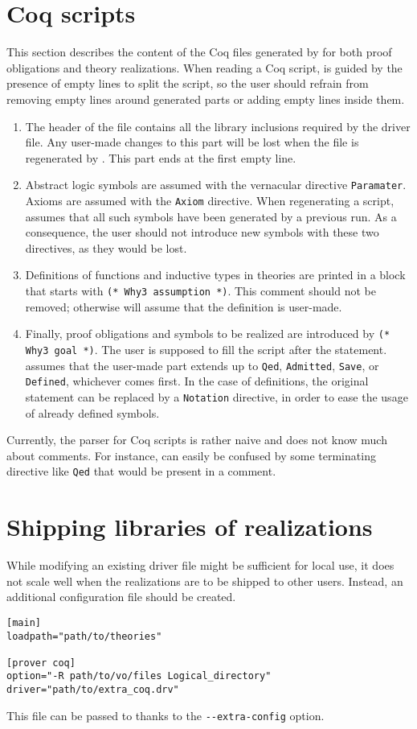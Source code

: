 \section{Coq scripts}

This section describes the content of the Coq files generated by \why for
both proof obligations and theory realizations. When reading a Coq
script, \why is guided by the presence of empty lines to split the
script, so the user should refrain from removing empty lines around
generated parts or adding empty lines inside them.

\begin{enumerate}
\item	The header of the file contains all the library inclusions
	required by the driver file. Any user-made changes to this part
	will be lost when the file is regenerated by \why. This part ends
	at the first empty line.
\item	Abstract logic symbols are assumed with the vernacular directive
	\verb+Paramater+. Axioms are assumed with the \verb+Axiom+
	directive. When regenerating a script, \why assumes that all such
	symbols have been generated by a previous run. As a consequence,
	the user should not introduce new symbols with these two
	directives, as they would be lost.
\item	Definitions of functions and inductive types in theories are
	printed in a block that starts with \verb+(* Why3 assumption *)+.
	This comment should not be removed; otherwise \why will assume
	that the definition is user-made.
\item	Finally, proof obligations and symbols to be realized are
	introduced by \verb+(* Why3 goal *)+. The user is supposed to
	fill the script after the statement. \why assumes that the
	user-made part extends up to \verb+Qed+, \verb+Admitted+,
	\verb+Save+, or \verb+Defined+, whichever comes first. In the
	case of definitions, the original statement can be replaced by
	a \verb+Notation+ directive, in order to ease the usage of
	already defined symbols.
\end{enumerate}

Currently, the parser for Coq scripts is rather naive and does not know
much about comments. For instance, \why can easily be confused by
some terminating directive like \verb+Qed+ that would be present in a
comment.

\section{Shipping libraries of realizations}

While modifying an existing driver file might be sufficient for local
use, it does not scale well when the realizations are to be shipped to
other users. Instead, an additional configuration file should be created.

\begin{verbatim}
[main]
loadpath="path/to/theories"

[prover coq]
option="-R path/to/vo/files Logical_directory"
driver="path/to/extra_coq.drv"
\end{verbatim}

This file can be passed to \why thanks to the \verb+--extra-config+
option.
